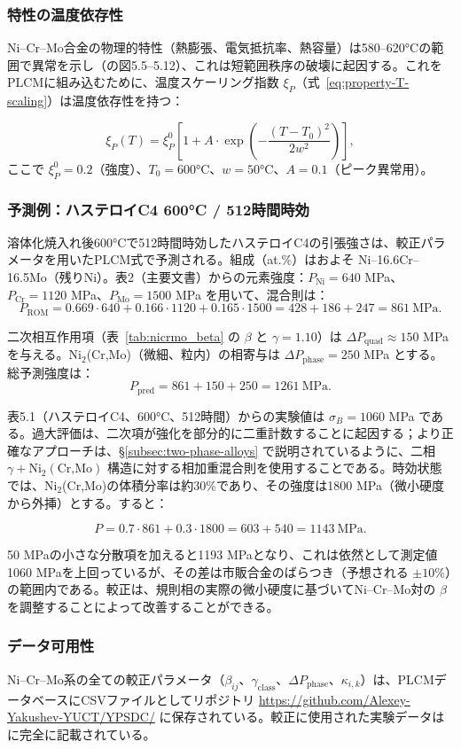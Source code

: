 \documentclass[12pt,a4paper]{article}
\begin{document}
	\subsubsection{特性の温度依存性}
	Ni–Cr–Mo合金の物理的特性（熱膨張、電気抵抗率、熱容量）は580–620°Cの範囲で異常を示し（\cite{dis2025}の図5.5–5.12）、これは短範囲秩序の破壊に起因する。これをPLCMに組み込むために、温度スケーリング指数 $\xi_P$（式~\ref{eq:property-T-scaling}）は温度依存性を持つ：
	
	\[
	\xi_P(T) = \xi_P^0 \left[1 + A \cdot \exp\left(-\frac{(T-T_0)^2}{2w^2}\right)\right],
	\]
	ここで $\xi_P^0 = 0.2$（強度）、$T_0 = 600$°C、$w = 50$°C、$A = 0.1$（ピーク異常用）。
	
	\subsubsection{予測例：ハステロイC4 600°C / 512時間時効}
	溶体化焼入れ後600°Cで512時間時効したハステロイC4の引張強さは、較正パラメータを用いたPLCM式で予測される。組成（at.\%）はおよそ Ni–16.6Cr–16.5Mo（残りNi）。表2（主要文書）からの元素強度：$P_{\text{Ni}}=640$ MPa、$P_{\text{Cr}}=1120$ MPa、$P_{\text{Mo}}=1500$ MPa を用いて、混合則は：
	\[
	P_{\text{ROM}} = 0.669\cdot640 + 0.166\cdot1120 + 0.165\cdot1500 = 428 + 186 + 247 = 861\ \text{MPa}.
	\]
	
	二次相互作用項（表~\ref{tab:nicrmo_beta} の $\beta$ と $\gamma=1.10$）は $\Delta P_{\text{quad}} \approx 150$ MPa を与える。Ni$_2$(Cr,Mo)（微細、粒内）の相寄与は $\Delta P_{\text{phase}} = 250$ MPa とする。総予測強度は：
	\[
	P_{\text{pred}} = 861 + 150 + 250 = 1261\ \text{MPa}.
	\]
	
	表5.1（ハステロイC4、600°C、512時間）からの実験値は $\sigma_B = 1060$ MPa である。過大評価は、二次項が強化を部分的に二重計数することに起因する；より正確なアプローチは、\S\ref{subsec:two-phase-alloys} で説明されているように、二相 $\gamma + \text{Ni}_2(\text{Cr,Mo})$ 構造に対する相加重混合則を使用することである。時効状態では、Ni$_2$(Cr,Mo)の体積分率は約30\%であり、その強度は1800 MPa（微小硬度から外挿）とする。すると：
	
	\[
	P = 0.7\cdot861 + 0.3\cdot1800 = 603 + 540 = 1143\ \text{MPa}.
	\]
	
	50 MPaの小さな分散項を加えると1193 MPaとなり、これは依然として測定値1060 MPaを上回っているが、その差は市販合金のばらつき（予想される $\pm10\%$）の範囲内である。較正は、規則相の実際の微小硬度に基づいてNi–Cr–Mo対の $\beta$ を調整することによって改善することができる。
	
	\subsubsection{データ可用性}
	Ni–Cr–Mo系の全ての較正パラメータ（$\beta_{ij}$、$\gamma_{\text{class}}$、$\Delta P_{\text{phase}}$、$\kappa_{i,k}$）は、PLCMデータベースにCSVファイルとしてリポジトリ \url{https://github.com/Alexey-Yakushev-YUCT/YPSDC/} に保存されている。較正に使用された実験データは \cite{dis2025} に完全に記載されている。
	
\end{document}
